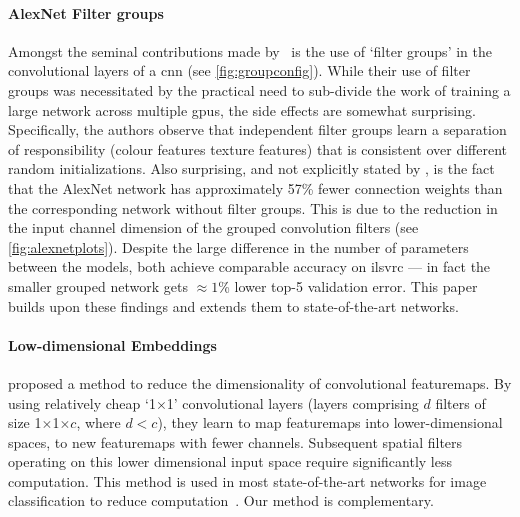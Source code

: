 \documentclass[thesis]{subfiles}
\begin{document}
	\paragraph{AlexNet Filter groups}\label{alexnetfiltergroups} Amongst the seminal contributions made by \citet{Krizhevsky2012}~is the use of `filter groups' in the convolutional layers of a \gls{cnn} (see \cref{fig:groupconfig}). While their use of filter groups was necessitated by the practical need to sub-divide the work of training a large network across multiple \gls{gpu}s, the side effects are somewhat surprising. Specifically, the authors observe that independent filter groups learn a separation of responsibility (colour features \vs texture features) that is consistent over different random initializations. Also surprising, and not explicitly stated by \citet{Krizhevsky2012}, is the fact that the AlexNet network has approximately 57\% fewer connection weights than the corresponding network without filter groups. This is due to the reduction in the input channel dimension of the grouped convolution filters (see \cref{fig:alexnetplots}).
	Despite the large difference in the number of parameters between the models, both achieve comparable accuracy on \gls{ilsvrc} --- in fact the smaller grouped network gets $\approx1$\% lower top-5 validation error. This paper builds upon these findings and extends them to state-of-the-art networks.
	
	\paragraph{Low-dimensional Embeddings}
	\citet{Lin2013NiN} proposed a method to reduce the dimensionality of convolutional \glspl{featuremap}. 
	By using relatively cheap `1$\times$1' convolutional layers (\ie layers comprising $d$ filters of size 1$\times$1$\times$$c$, where $d<c$), they learn to map \glspl{featuremap} into lower-dimensional spaces, \ie to new \glspl{featuremap} with fewer channels. Subsequent spatial filters operating on this lower dimensional input space require significantly less computation. This method is used in most state-of-the-art networks for image classification to reduce computation~\citep{Szegedy2014going,He2015}. Our method is complementary.
	
\end{document}
